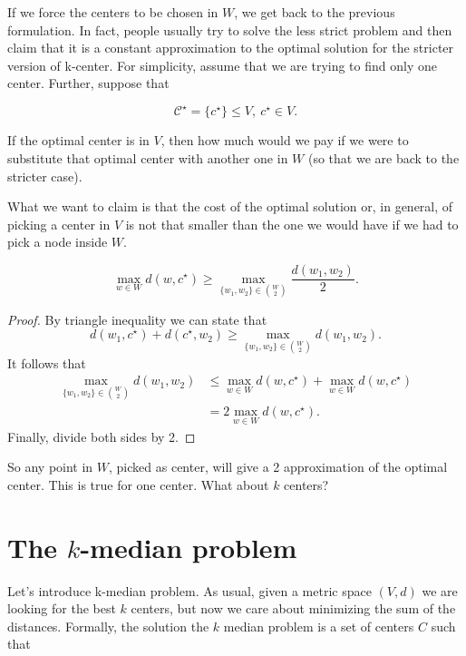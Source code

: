 If we force the centers to be chosen in $W$, we get back to the previous formulation. In fact, people usually try to solve the less strict problem and then claim that it is a constant approximation to the optimal solution for the stricter version of k-center. For simplicity, assume that we are trying to find only one center. Further, suppose that 

\begin{equation}
\mathcal{C^\star} = \{c^\star\} \leq V,\ c^\star \in V.
\end{equation}

If the optimal center is in $V$, then how much would we pay if we were to substitute that optimal center with another one in $W$ (so that we are back to the stricter case).

What we want to claim is that the cost of the optimal solution or, in general, of picking a center in $V$ is not that smaller than the one we would have if we had to pick a node inside $W$.
\begin{lem}
	\begin{equation}
	\max_{w \in W} d(w, c^\star) \geq \max_{\{w_1, w_2\} \in \binom{W}{2}} \frac{d(w_1, w_2)}{2}.
	\end{equation}
\end{lem}
\begin{proof} By triangle inequality we can state that
	\begin{equation}
	d(w_1, c^\star) + d(c^\star, w_2) \geq\max_{\{w_1, w_2\} \in \binom{W}{2}} d(w_1, w_2).
	\end{equation}
	It follows that
	\begin{align}
	\max_{\{w_1, w_2\} \in \binom{W}{2}}d(w_1, w_2) &\leq \max_{w \in W} d(w, c^\star) + \max_{w \in W}d(w, c^\star)\\
	& =2\max_{w \in W}d(w, c^\star).
	\end{align}
Finally, divide both sides by 2.
\end{proof}

So any point in $W$, picked as center, will give a 2 approximation of the optimal center. This is true for one center. What about $k$ centers? 

\section{The $k$-median problem}

Let's introduce k-median problem. As usual, given a metric space $(V, d)$ we are looking for the best $k$ centers, but now we care about minimizing the sum of the distances. Formally, the solution the $k$ median problem is a set of centers $C$ such that

